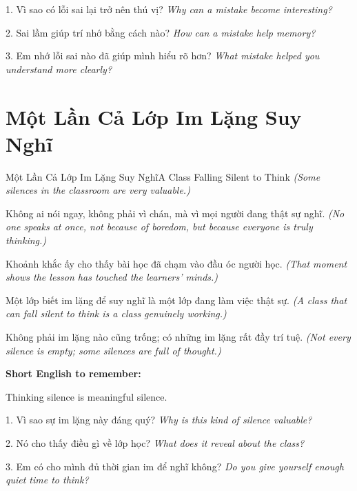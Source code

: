 \begin{tuhocnhanh}
1. Vì sao có lỗi sai lại trở nên thú vị? \textit{Why can a mistake become interesting?}

2. Sai lầm giúp trí nhớ bằng cách nào? \textit{How can a mistake help memory?}

3. Em nhớ lỗi sai nào đã giúp mình hiểu rõ hơn? \textit{What mistake helped you understand more clearly?}
\end{tuhocnhanh}
\ngancach

\section{Một Lần Cả Lớp Im Lặng Suy Nghĩ}
\begin{truyen}{Một Lần Cả Lớp Im Lặng Suy Nghĩ}{A Class Falling Silent to Think}
\textit{(Some silences in the classroom are very valuable.)}

Không ai nói ngay, không phải vì chán, mà vì mọi người đang thật sự nghĩ.
\textit{(No one speaks at once, not because of boredom, but because everyone is truly thinking.)}

Khoảnh khắc ấy cho thấy bài học đã chạm vào đầu óc người học.
\textit{(That moment shows the lesson has touched the learners' minds.)}

Một lớp biết im lặng để suy nghĩ là một lớp đang làm việc thật sự.
\textit{(A class that can fall silent to think is a class genuinely working.)}
\end{truyen}

\begin{baihoc}
Không phải im lặng nào cũng trống; có những im lặng rất đầy trí tuệ.
\textit{(Not every silence is empty; some silences are full of thought.)}
\end{baihoc}

\begin{ghinhoanh}
\textbf{Short English to remember:}

Thinking silence is meaningful silence.

\end{ghinhoanh}

\begin{tuhocnhanh}
1. Vì sao sự im lặng này đáng quý? \textit{Why is this kind of silence valuable?}

2. Nó cho thấy điều gì về lớp học? \textit{What does it reveal about the class?}

3. Em có cho mình đủ thời gian im để nghĩ không? \textit{Do you give yourself enough quiet time to think?}
\end{tuhocnhanh}
\ngancach

